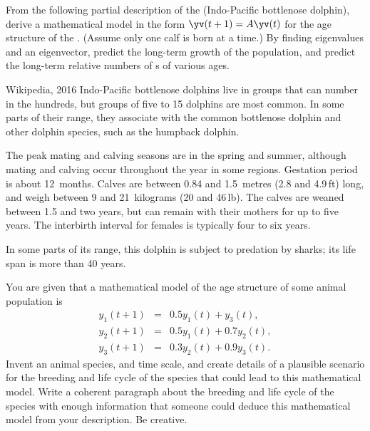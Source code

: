 \begin{exercise} \label{ex:} 
From the following partial description of the  (Indo-Pacific bottlenose dolphin), 
derive a mathematical model in the form \(\yv(t+1)=A\yv(t)\) for the age structure of the .
(Assume only one calf is born at a time.)
By finding eigenvalues and an eigenvector, predict the long-term growth of the population, and predict the long-term relative numbers of s of various ages.
\begin{quoted}{Wikipedia, 2016}
Indo-Pacific bottlenose dolphins live in groups that can number in the hundreds, but groups of five to 15 dolphins are most common.  In some parts of their range, they associate with the common bottlenose dolphin and other dolphin species, such as the humpback dolphin.

The peak mating and calving seasons are in the spring and summer, although mating and calving occur throughout the year in some regions. Gestation period is about 12~months. Calves are between 0.84 and 1.5~metres (2.8 and 4.9\,ft) long, and weigh between 9 and 21~kilograms (20 and 46\,lb). The calves are weaned between 1.5 and two years, but can remain with their mothers for up to five years. The interbirth interval for females is typically four to six years.

In some parts of its range, this dolphin is subject to predation by sharks; its life span is more than 40 years.
\end{quoted}
\end{exercise}






\begin{exercise} \label{ex:} 
You are given that a mathematical model of the age structure of some animal population is
\begin{eqnarray*}
y_1(t+1)&=& 0.5y_1(t)+y_3(t),\\
y_2(t+1)&=& 0.5y_1(t)+0.7y_2(t),\\
y_3(t+1)&=& 0.3y_2(t)+0.9y_3(t).
\end{eqnarray*}
Invent an animal species, and time scale, and create details of a plausible scenario for the breeding and life cycle of the species that could lead to this mathematical model.  
Write a coherent paragraph about the breeding and life cycle of the species with enough information that someone could deduce this mathematical model from your description.  
Be creative.
\end{exercise}











